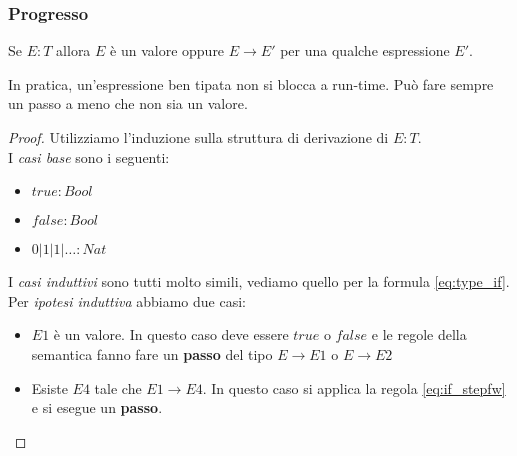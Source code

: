 \subsubsection{Progresso}
\begin{definition}[Progresso]
	Se $E:T$ allora $E$ è un valore oppure $E \rightarrow E'$ per una qualche espressione $E'$.
\end{definition}
In pratica, un'espressione ben tipata non si blocca a run-time. Può fare sempre un passo a meno che non sia un valore.
\begin{proof}
	\label{proof_progresso}
	Utilizziamo l'induzione sulla struttura di derivazione di $E:T$.\\
	I \textit{casi base} sono i seguenti:
	\begin{itemize}
		\item $true:Bool$
		\item $false:Bool$
		\item $0 \vert 1 \vert 1 \vert \ldots : Nat$
	\end{itemize}
	I \textit{casi induttivi} sono tutti molto simili, vediamo quello per la formula \ref{eq:type_if}. \\
	Per \textit{ipotesi induttiva} abbiamo due casi:
	\begin{itemize}
		\item $E1$ è un valore. In questo caso deve essere $true$ o $false$ e le regole della semantica fanno fare un \textbf{passo} del tipo $E \rightarrow E1$ o $E \rightarrow E2$
		\item  Esiste $E4$ tale che $E1 \rightarrow E4$. In questo caso si applica la regola \ref{eq:if_stepfw} e si esegue un \textbf{passo}.
	\end{itemize}
\end{proof}

